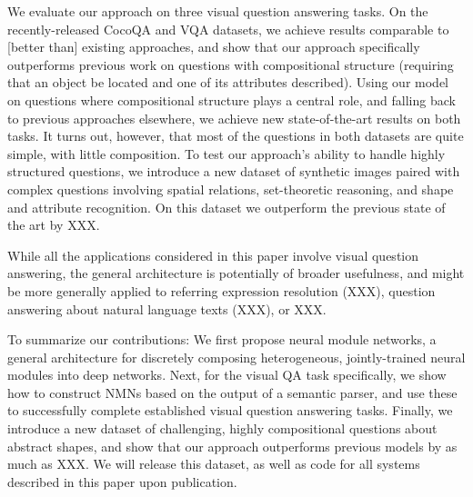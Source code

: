 
We evaluate our approach on three visual question answering tasks. On the
recently-released CocoQA \cite{yu15arxiv} and  VQA \cite{antol15iccv} datasets,
we achieve results comparable to [better than] existing approaches, and show
that our approach specifically outperforms previous work on questions with
compositional structure (\eg requiring that an object be located and one of its
attributes described). Using our model on questions where compositional
structure plays a central role, and falling back to previous approaches
elsewhere, we achieve new state-of-the-art results on both tasks. It turns out,
however, that most of the questions in both datasets are quite simple, with
little composition. To test our approach's ability to handle highly structured
questions, we introduce a new dataset of synthetic images paired with complex
questions involving spatial relations, set-theoretic reasoning, and shape and
attribute recognition. On this dataset we outperform the previous state of the
art by XXX.

While all the applications considered in this paper involve visual question
answering, the general architecture is potentially of broader usefulness, and
might be more generally applied to referring expression resolution (XXX),
question answering about natural language texts (XXX), or XXX.


To summarize our contributions: We first propose neural module networks, a
general architecture for discretely composing heterogeneous, jointly-trained
neural modules into deep networks. Next, for the visual QA task specifically, we
show how to construct NMNs based on the output of a semantic parser, and use
these to successfully complete established visual question answering tasks.
Finally, we introduce a new dataset of challenging, highly compositional
questions about abstract shapes, and show that our approach outperforms previous
models by as much as XXX. We will release this dataset, as well as code for all
systems described in this paper upon publication.

